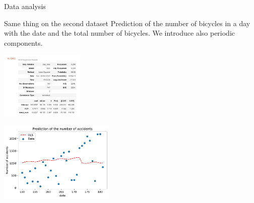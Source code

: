 \documentclass[unknownkeysallowed]{beamer}
\begin{document}
\begin{frame}{Data analysis}

\begin{block}{Same thing on the second dataset}
Prediction of the number of bicycles in a day with the date and the total number of bicycles. We introduce also periodic components.
\end{block}


\begin{minipage}[c]{.36\linewidth}
     \begin{center}
             \includegraphics[width=4cm]{stat_model_albert}
         \end{center}
   \end{minipage} \hfill
   \begin{minipage}[c]{.55\linewidth}
    \begin{center}
            \includegraphics[width=5.5cm]{accidentpredictionalbert1}

        \end{center}

 \end{minipage}




\end{frame}











\end{document}
